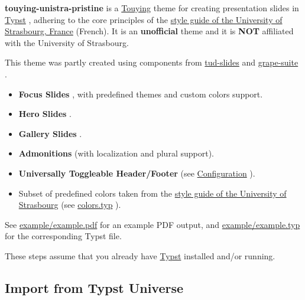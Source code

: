 \textbf{touying-unistra-pristine} is a
\href{https://github.com/touying-typ/touying}{Touying} theme for
creating presentation slides in
\href{https://github.com/typst/typst}{Typst} , adhering to the core
principles of the \href{https://langagevisuel.unistra.fr/}{style guide
of the University of Strasbourg, France} (French). It is an
\textbf{unofficial} theme and it is \textbf{NOT} affiliated with the
University of Strasbourg.

This theme was partly created using components from
\href{https://github.com/typst-tud/tud-slides}{tud-slides} and
\href{https://github.com/piepert/grape-suite}{grape-suite} .

\begin{itemize}
\tightlist
\item
  \textbf{Focus Slides} , with predefined themes and custom colors
  support.
\item
  \textbf{Hero Slides} .
\item
  \textbf{Gallery Slides} .
\item
  \textbf{Admonitions} (with localization and plural support).
\item
  \textbf{Universally Toggleable Header/Footer} (see
  \href{https://github.com/typst/packages/raw/main/packages/preview/touying-unistra-pristine/1.2.0/\#Configuration}{Configuration}
  ).
\item
  Subset of predefined colors taken from the
  \href{https://langagevisuel.unistra.fr/index.php?id=396}{style guide
  of the University of Strasbourg} (see
  \href{https://github.com/typst/packages/raw/main/packages/preview/touying-unistra-pristine/1.2.0/colors.typ}{colors.typ}
  ).
\end{itemize}

See
\href{https://github.com/typst/packages/raw/main/packages/preview/touying-unistra-pristine/1.2.0/example/example.pdf}{example/example.pdf}
for an example PDF output, and
\href{https://github.com/typst/packages/raw/main/packages/preview/touying-unistra-pristine/1.2.0/example/example.typ}{example/example.typ}
for the corresponding Typst file.

These steps assume that you already have
\href{https://typst.app/}{Typst} installed and/or running.

\subsection{Import from Typst
Universe}\label{import-from-typst-universe}

